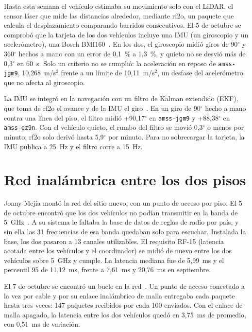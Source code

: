 \documentclass[12pt,letterpaper]{article}
\begin{document}
Hasta esta semana el vehículo estimaba su movimiento solo con el LiDAR, el sensor láser que mide las distancias alrededor, mediante rf2o, un paquete que calcula el desplazamiento comparando barridos consecutivos. El 5 de octubre se comprobó que la tarjeta de los dos vehículos incluye una IMU (un giroscopio y un acelerómetro), una Bosch BMI160~\cite{imu}. En los dos, el giroscopio midió giros de 90$^\circ$ y 360$^\circ$ hechos a mano con un error de 0,1~\% a 1,3~\%, y quieto no se desvió más de 0,3$^\circ$ en 60~s. Solo un criterio no se cumplió: la aceleración en reposo de \texttt{amss-jgm9}, 10,268~m/s$^2$ frente a un límite de 10,11~m/s$^2$, un desfase del acelerómetro que no afecta al giroscopio.

La IMU se integró en la navegación con un filtro de Kalman extendido (EKF), que toma de rf2o el avance y de la IMU el giro~\cite{integracion}. En un giro de 90$^\circ$ hecho a mano contra una línea del piso, el filtro midió +90,17$^\circ$ en \texttt{amss-jgm9} y +88,38$^\circ$ en \texttt{amss-ez9n}. Con el vehículo quieto, el rumbo del filtro se movió 0,3$^\circ$ o menos por minuto; rf2o solo derivó hasta 5,9$^\circ$ por minuto. Para no sobrecargar la tarjeta, la IMU publica a 25~Hz y el filtro corre a 15~Hz.

\section{Red inalámbrica entre los dos pisos}

Jonny Mejía montó la red del sitio nuevo, con un punto de acceso por piso. El 5 de octubre encontró que los dos vehículos no podían transmitir en la banda de 5~GHz~\cite{red5}. A su sistema le faltaba la base de datos de reglas de radio por país, y sin ella las 31 frecuencias de esa banda quedaban solo para escuchar. Instalada la base, los dos pasaron a 13 canales utilizables. El requisito RF-15 (latencia acotada entre los vehículos y el coordinador) se midió de nuevo entre los dos vehículos sobre 5~GHz y cumple. La latencia mediana fue de 5,99~ms y el percentil 95 de 11,12~ms, frente a 7,61~ms y 20,76~ms en septiembre.

El 7 de octubre se encontró un bucle en la red~\cite{bucle}. Un punto de acceso conectado a la vez por cable y por su enlace inalámbrico de malla entregaba cada paquete hasta tres veces: 147 paquetes recibidos por cada 100 enviados. Con el enlace de malla apagado, la latencia entre los dos vehículos quedó en 3,75~ms de promedio, con 0,51~ms de variación.
\end{document}
